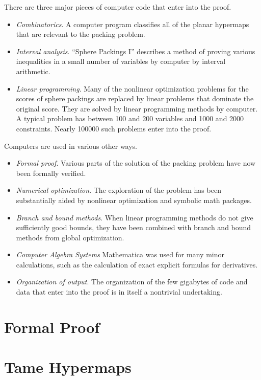 There are three major pieces of computer code that enter into the proof.

\begin{itemize}
\item {\it Combinatorics}.  A computer program classifies all of the
  planar hypermaps that are relevant to the packing problem.
\item {\it  Interval analysis}.  ``Sphere Packings
I'' describes a method of proving various inequalities in a small number
of variables by computer by interval arithmetic.
\item {\it  Linear programming}.  Many of the nonlinear optimization
problems for the scores of sphere packings are replaced by linear
problems that dominate the original score.  They are solved
by linear programming methods by computer.  A typical problem has
between 100 and 200 variables and 1000 and 2000 constraints.  Nearly
100000
such problems enter into the proof.
\end{itemize}

Computers are used in various other ways.  


\begin{itemize}
\item {\it Formal proof}.
Various parts of the solution of the packing problem have now been
formally verified.
\item  {\it Numerical optimization}.  The exploration of the problem
has been substantially
aided by nonlinear optimization and symbolic math packages.
\item {\it Branch and bound methods}.  When linear programming methods
  do not give sufficiently good bounds, they have been combined with
  branch and bound methods from global optimization.
\item {\it Computer Algebra Systems} Mathematica was used for many
  minor calculations, such as the calculation of exact explicit
  formulas for derivatives.
\item {\it Organization of output}.
The organization of the few gigabytes of code and data that
enter into the proof is in itself a nontrivial undertaking.
\end{itemize}



\section{Formal Proof}


\section{Tame Hypermaps}

